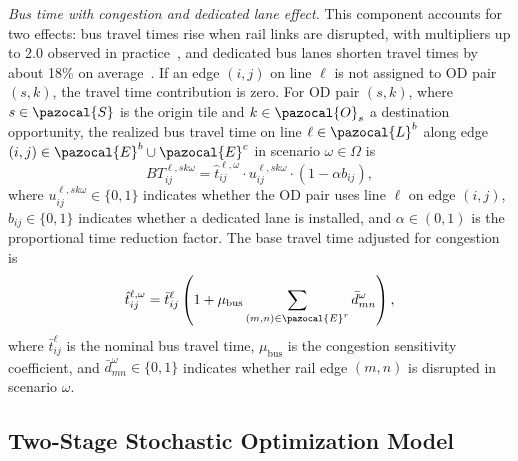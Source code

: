 \documentclass[3p,times,procedia]{elsarticle}
\begin{document}
\textit{Bus time with congestion and dedicated lane effect.}
This component accounts for two effects: bus travel times rise when rail links are disrupted, with multipliers up to 2.0 observed in practice~\citep{dft2018congestion}, and dedicated bus lanes shorten travel times by about 18\% on average~\citep{russo2022buslane}. If an edge $(i,j)$ on line $\ell$ is not assigned to OD pair $(s,k)$, the travel time contribution is zero.  
%
For OD pair $(s,k)$, where $s \in \pazocal{S}$ is the origin tile and $k \in \pazocal{O}_s$ a destination opportunity, the realized bus travel time on line $\ell \in \pazocal{L}^b$ along edge $(i,j) \in \pazocal{E}^b \cup \pazocal{E}^c$ in scenario $\omega \in \Omega$ is
\begin{equation}
BT_{ij}^{\ell,sk\omega}
=
\hat{t}_{ij}^{\ell,\omega} \cdot u_{ij}^{\ell,sk\omega} \cdot (1 - \alpha b_{ij}),
\label{eq:ttc2}
\end{equation}
where $u_{ij}^{\ell,sk\omega}\in\{0,1\}$ indicates whether the OD pair uses line $\ell$ on edge $(i,j)$, $b_{ij}\in\{0,1\}$ indicates whether a dedicated lane is installed, and $\alpha \in (0,1)$ is the proportional time reduction factor.  
%
The base travel time adjusted for congestion is
\begin{equation}
\hat{t}_{ij}^{\ell,\omega}
=
\bar{t}_{ij}^\ell
\left(1 + \mu_{\text{bus}} \sum_{(m,n)\in \pazocal{E}^r} \bar{d}_{mn}^\omega \right),
\end{equation}
where $\bar{t}_{ij}^\ell$ is the nominal bus travel time, $\mu_{\text{bus}}$ is the congestion sensitivity coefficient, and $\bar{d}_{mn}^\omega \in \{0,1\}$ indicates whether rail edge $(m,n)$ is disrupted in scenario $\omega$.

\subsection{Two-Stage Stochastic Optimization Model}\label{sec:problemFormulation}
\end{document}
